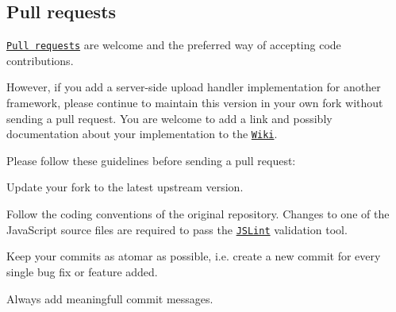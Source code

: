 \subsection*{Pull requests}

\href{https://help.github.com/articles/using-pull-requests}{\tt Pull requests} are welcome and the preferred way of accepting code contributions.

However, if you add a server-\/side upload handler implementation for another framework, please continue to maintain this version in your own fork without sending a pull request. You are welcome to add a link and possibly documentation about your implementation to the \href{https://github.com/blueimp/jQuery-File-Upload/wiki}{\tt Wiki}.

Please follow these guidelines before sending a pull request\-:


\begin{DoxyEnumerate}
\item Update your fork to the latest upstream version.
\item Follow the coding conventions of the original repository. Changes to one of the Java\-Script source files are required to pass the \href{http://jslint.com/}{\tt J\-S\-Lint} validation tool.
\item Keep your commits as atomar as possible, i.\-e. create a new commit for every single bug fix or feature added.
\item Always add meaningfull commit messages. 
\end{DoxyEnumerate}
